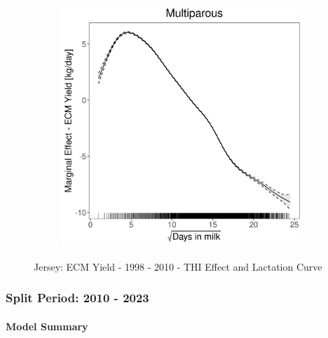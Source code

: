 \begin{figure}[H]
\begin{subfigure}[b]{0.45\textwidth}
    \end{subfigure}
    \hspace{0.05\textwidth} %
    \begin{subfigure}[b]{0.45\textwidth}
        \centering
        \includegraphics[width=\textwidth]{thesis/figures/models/ecm/before2010/je_ecm_before2010/je_ecm_before2010_marginal_dim_milk_multi.png}
    \end{subfigure}
    \caption[]{Jersey: ECM Yield - 1998 - 2010 - THI Effect and Lactation Curve}
    \label{fig:main}
\end{figure}

\subsubsection{Split Period: 2010 - 2023}\label{model:je_ecm_after}

\paragraph{Model Summary} \quad \\

